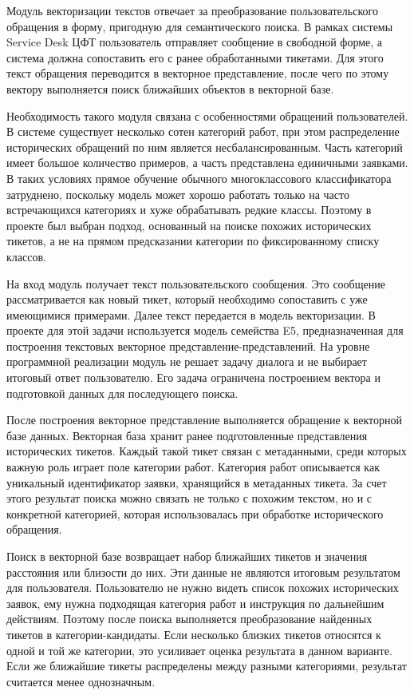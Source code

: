 \documentclass[14pt,a4paper]{extarticle}
\numberwithin{figure}{section}
\numberwithin{table}{section}
\begin{document}
Модуль векторизации текстов отвечает за преобразование пользовательского
обращения в форму, пригодную для семантического поиска. В рамках системы
Service Desk ЦФТ пользователь отправляет сообщение в свободной форме, а
система должна сопоставить его с ранее обработанными тикетами. Для этого
текст обращения переводится в векторное представление, после чего по этому вектору
выполняется поиск ближайших объектов в векторной базе.

Необходимость такого модуля связана с особенностями обращений
пользователей. В системе существует несколько сотен категорий работ, при
этом распределение исторических обращений по ним является
несбалансированным. Часть категорий имеет большое количество примеров, а
часть представлена единичными заявками. В таких условиях прямое обучение
обычного многоклассового классификатора затруднено, поскольку модель
может хорошо работать только на часто встречающихся категориях и хуже
обрабатывать редкие классы. Поэтому в проекте был выбран подход,
основанный на поиске похожих исторических тикетов, а не на прямом
предсказании категории по фиксированному списку классов.

На вход модуль получает текст пользовательского сообщения. Это сообщение
рассматривается как новый тикет, который необходимо сопоставить с уже
имеющимися примерами. Далее текст передается в модель векторизации. В
проекте для этой задачи используется модель семейства E5,
предназначенная для построения текстовых векторное представление-представлений. На
уровне программной реализации модуль не решает задачу диалога и не
выбирает итоговый ответ пользователю. Его задача ограничена построением
вектора и подготовкой данных для последующего поиска.

После построения векторное представление выполняется обращение к векторной базе
данных. Векторная база хранит ранее подготовленные представления
исторических тикетов. Каждый такой тикет связан с метаданными, среди
которых важную роль играет поле категории работ. Категория работ
описывается как уникальный идентификатор заявки, хранящийся в метаданных
тикета. За счет этого результат поиска можно связать не только с похожим
текстом, но и с конкретной категорией, которая использовалась при
обработке исторического обращения.

Поиск в векторной базе возвращает набор ближайших тикетов и значения
расстояния или близости до них. Эти данные не являются итоговым
результатом для пользователя. Пользователю не нужно видеть список
похожих исторических заявок, ему нужна подходящая категория работ и
инструкция по дальнейшим действиям. Поэтому после поиска выполняется
преобразование найденных тикетов в категории-кандидаты. Если несколько
близких тикетов относятся к одной и той же категории, это усиливает
оценка результата в данном варианте. Если же ближайшие тикеты
распределены между разными категориями, результат считается менее
однозначным.
\end{document}
